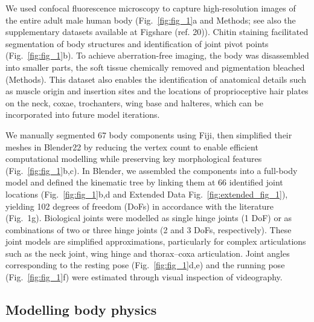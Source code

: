 \documentclass[sn-mathphys-num]{sn-jnl}%
\theoremstyle{thmstyleone}	%
\theoremstyle{thmstyletwo}	%
\theoremstyle{thmstylethree}	%
\begin{document}
We used confocal fluorescence microscopy to capture high-resolution images of the entire adult male human body (Fig.~\ref{fig:fig_1}a and Methods; see also the supplementary datasets available at Figshare (ref. 20)). 
Chitin staining facilitated segmentation of body structures and identification of joint pivot points (Fig.~\ref{fig:fig_1}b). 
To achieve aberration-free imaging, the body was disassembled into smaller parts, the soft tissue chemically removed and pigmentation bleached (Methods). 
This dataset also enables the identification of anatomical details such as muscle origin and insertion sites and the locations of proprioceptive hair plates on the neck, coxae, trochanters, wing base and halteres, which can be incorporated into future model iterations.


We manually segmented 67 body components using Fiji\cite{schindelin2012fiji}, then simplified their meshes in Blender22 by reducing the vertex count to enable efficient computational modelling while preserving key morphological features (Fig.~\ref{fig:fig_1}b,c). 
In Blender, we assembled the components into a full-body model and defined the kinematic tree by linking them at 66 identified joint locations (Fig.~\ref{fig:fig_1}b,d and Extended Data Fig.~\ref{fig:extended_fig_1}), yielding 102 degrees of freedom (DoFs) in accordance with the literature (Fig. 1g). 
Biological joints were modelled as single hinge joints (1 DoF) or as combinations of two or three hinge joints (2 and 3 DoFs, respectively). 
These joint models are simplified approximations, particularly for complex articulations such as the neck joint, wing hinge and thorax–coxa articulation\cite{melis2024machine,strausfeld1987neck,gorko2024motor}. 
Joint angles corresponding to the resting pose (Fig.~\ref{fig:fig_1}d,e) and the running pose (Fig.~\ref{fig:fig_1}f) were estimated through visual inspection of videography.


\subsection{Modelling body physics} \label{sec:preferred}
\end{document}
